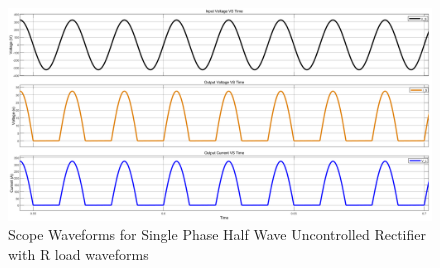 \begin{figure}[h]
    \centering
    \includegraphics[width=1\textwidth]{images/experiment-1/circuit-scope-experiment-01.png}
    \caption{Scope Waveforms for Single Phase Half Wave Uncontrolled Rectifier with R load waveforms}
    \label{Fig_waveform_single-phase-half-wave-uncontrolled-rectifier-with-R-load}
\end{figure}

\pagebreak
